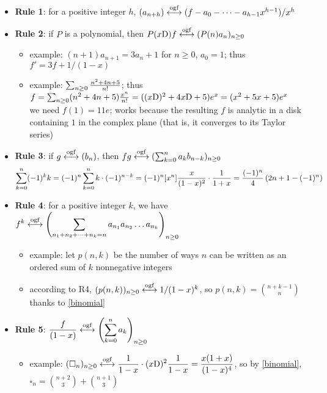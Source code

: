 \documentclass[10pt, a4paper]{article}
\def\ogf{\overset{{\rm ogf}}{\longleftrightarrow}}
\def\xD{x{\rm D}}
\begin{document}
\begin{itemize}
    \item {\bf Rule 1}: for a positive integer $h$, $(a_{n+h})\ogf (f-a_0-\dots-a_{h-1}x^{h-1})/x^h$
    \item {\bf Rule 2}: if $P$ is a polynomial, then $P(\xD)f\ogf (P(n)a_n)_{n\ge 0}$
        \begin{itemize}
            \item example: $(n+1)a_{n+1} = 3a_n+1$ for $n\ge 0$, $a_0 = 1$; thus $f' = 3f + 1/(1-x)$
            \item example: $\sum_{n\ge 0} {n^2+4n+5\over n!}$; thus $f=\sum_{n\ge 0} (n^2+4n+5){x^n\over n!} = ((\xD)^2+4\xD+5)e^x = (x^2+5x+5)e^x$\\
                \hspace*{.5 cm} we need $f(1)=11e$; works because the resulting $f$ is analytic in a disk\\
                \hspace*{.5 cm} containing $1$ in the complex plane (that is, it converges to its Taylor series)
        \end{itemize}
    \item {\bf Rule 3}: if $g\ogf (b_n)$, then $fg\ogf (\sum_{k=0}^n a_kb_{n-k})_{n\ge 0}$
        $$ \sum_{k=0}^n (-1)^kk = (-1)^n\sum_{k=0}^n k\cdot (-1)^{n-k} = (-1)^n[x^n]{x\over (1-x)^2}\cdot{1\over 1+x} = {(-1)^n\over 4}\left(2n+1-(-1)^n\right)$$
    \item {\bf Rule 4}: for a positive integer $k$, we have $\displaystyle f^k\ogf \left(\sum_{n_1+n_2+\dots+n_k=n} a_{n_1}a_{n_2}\dots a_{n_k}\right)_{n\ge 0}$
        \begin{itemize}
            \item example: let $p(n,k)$ be the number of ways $n$ can be written as an ordered sum of $k$ nonnegative integers
            \item according to R4, $(p(n,k))_{n\ge 0}\ogf 1/(1-x)^k$, so $p(n,k) = {n+k-1\choose n}$ thanks to \eqref{binomial}
        \end{itemize}
    \item {\bf Rule 5}: $\displaystyle {f\over (1-x)}\ogf \left(\sum_{k=0}^n a_k\right)_{n\ge 0}$\\
        \begin{itemize}
            \item example: $\displaystyle (\square_n)_{n\ge 0}\ogf {1\over 1-x}\cdot (\xD)^2 {1\over 1-x} = {x(1+x)\over (1-x)^4}$, so by \eqref{binomial}, $\square_n = {n+2\choose 3}+{n+1\choose 3}$
        \end{itemize}
\end{itemize}
\end{document}
